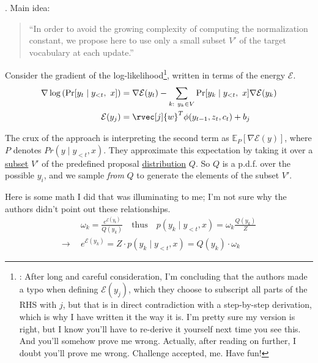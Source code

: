 \documentclass[11pt]{article}
\newcommand\myspace[1][]{\vspace{#1\bigskipamount}}
\newcommand\p{\Needspace{10\baselineskip} \noindent}
\begin{document}
\myspace
\p {}. Main idea:
\vspace{-1em}
\begin{center}
	\begin{quote}
		{\footnotesize ``In order to avoid the growing complexity of computing the normalization constant, we propose here to use only a small subset $V'$ of the target vocabulary at each update.''}
	\end{quote}
\end{center}
Consider the gradient of the log-likelihood\footnote{: After long and careful consideration, I'm concluding that the authors made a typo when defining $\mathcal{E}(y_j)$, which they choose to subscript all parts of the RHS with $j$, but that is in direct contradiction with a step-by-step derivation, which is why I have written it the way it is. I'm pretty sure my version is right, but I know you'll have to re-derive it yourself next time you see this. And you'll somehow prove me wrong. Actually, after reading on further, I doubt you'll prove me wrong. Challenge accepted, me. Have fun!}, written in terms of the energy $\mathcal{E}$. 
\begin{align}
\nabla \log\left(\Pr[y_t \mid y_{<t}, ~ x]  \right)
&= \nabla \mathcal{E}(y_t) 
- \sum_{k:~y_k\in V}\Pr[y_k \mid y_{<t}, ~ x]\nabla\mathcal{E}(y_k)\\
\mathcal{E}(y_j) &= \rvec[j]{w}^T \phi(y_{t - 1}, z_t, c_t) + b_j
\end{align}


\myspace
\p The crux of the approach is interpreting the second term as $\mathbb{E}_P\left[\nabla \mathcal{E}(y) \right]$, where $P$ denotes $Pr(y \mid y_{<t}, x)$. They approximate this expectation by taking it over a \underline{subset} $V'$ of the predefined proposal \underline{distribution} $Q$. So $Q$ is a p.d.f. over the possible $y_i$, and we sample \textit{from} $Q$ to generate the elements of the subset $V'$. 

Here is some math I did that was illuminating to me; I'm not sure why the authors didn't point out these relationships. 
\begin{align}
&\omega_k = \frac{e^{\mathcal{E}(y_k)}}{Q(y_k)} 
\quad\text{thus}\quad
p(y_k \mid y_{<t}, x) = \omega_k \frac{Q(y_k)}{Z} \\
\rightarrow~~  &e^{\mathcal{E}(y_k)} = Z \cdot p(y_k \mid y_{<t}, x) 
= Q(y_k) \cdot \omega_k
\end{align}
\end{document}
